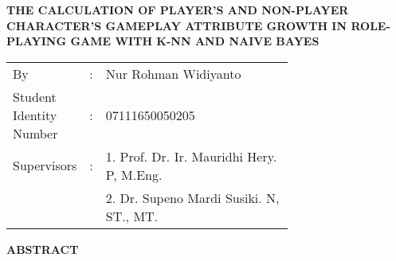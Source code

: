 \begin{spacing}{1}
	\begin{center}
		\large\textbf{THE CALCULATION OF PLAYER'S AND NON-PLAYER CHARACTER'S GAMEPLAY ATTRIBUTE GROWTH IN ROLE-PLAYING GAME WITH K-NN AND NAIVE BAYES}
	\end{center}
	\vspace{2ex}
	
	\begin{adjustwidth}{-0.2cm}{}
		\begin{tabular}{lcp{0.7\linewidth}}
			By &:& Nur Rohman Widiyanto \\
			Student Identity Number &:&	07111650050205 \\
			Supervisors &:& 1. Prof. Dr. Ir. Mauridhi Hery. P, M.Eng. \\
			& & 2. Dr. Supeno Mardi Susiki. N, ST., MT. \\
		\end{tabular}
	\end{adjustwidth}
	\vspace{2ex}
	
	\begin{center}
		\large\textbf{ABSTRACT}
	\end{center}
	\vspace{1ex}
	

\end{spacing}
